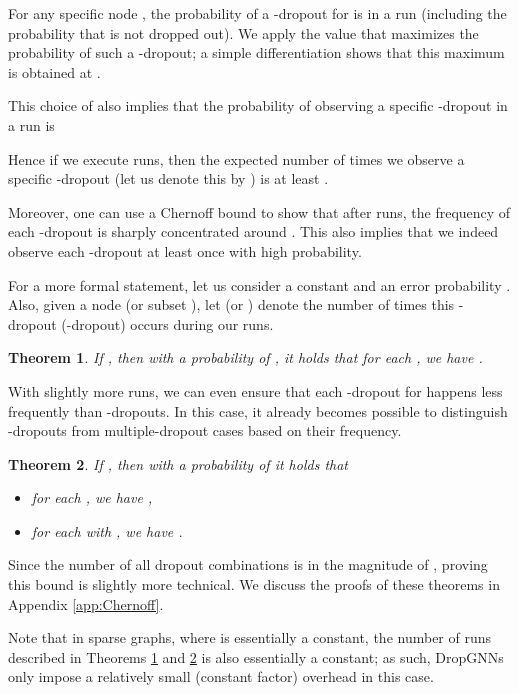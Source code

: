 \documentclass{article}
\newtheorem{theorem}{Theorem}
\begin{document}
For any specific node , the probability of a -dropout for  is  in a run (including the probability that  is not dropped out). We apply the  value that maximizes the probability of such a -dropout; a simple differentiation shows that this maximum is obtained at .

This choice of  also implies that the probability of observing a specific -dropout in a run is 

Hence if we execute  runs, then the expected number of times we observe a specific -dropout (let us denote this by ) is at least .

Moreover, one can use a Chernoff bound to show that after  runs, the frequency of each -dropout is sharply concentrated around . This also implies that we indeed observe each -dropout at least once with high probability.

For a more formal statement, let us consider a constant  and an error probability . Also, given a node  (or subset ), let  (or ) denote the number of times this -dropout (-dropout) occurs during our runs.

\begin{theorem} \label{th:chernoff1}
If , then with a probability of , it holds that  for each , we have .
\end{theorem}

With slightly more runs, we can even ensure that each -dropout for  happens less frequently than -dropouts. In this case, it already becomes possible to distinguish -dropouts from multiple-dropout cases based on their frequency.

\begin{theorem} \label{th:chernoff2}
If , then with a probability of  it holds that 
\begin{itemize}
\setlength\itemsep{0.8pt}
 \item for each , we have ,
 \item for each  with , we have .
\end{itemize}
\end{theorem}

Since the number of all dropout combinations is in the magnitude of , proving this bound is slightly more technical. We discuss the proofs of these theorems in Appendix \ref{app:Chernoff}.

Note that in sparse graphs, where  is essentially a constant, the number of runs described in Theorems \ref{th:chernoff1} and \ref{th:chernoff2} is also essentially a constant; as such, DropGNNs only impose a relatively small (constant factor) overhead in this case.
\end{document}
